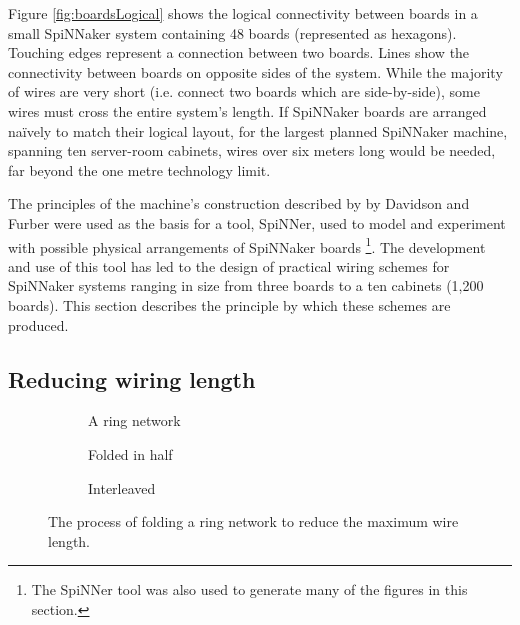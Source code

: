 		Figure \ref{fig:boardsLogical} shows the logical connectivity between boards
		in a small SpiNNaker system containing 48 boards (represented as hexagons).
		Touching edges represent a connection between two boards. Lines show the
		connectivity between boards on opposite sides of the system. While the
		majority of wires are very short (i.e. connect two boards which are
		side-by-side), some wires must cross the entire system's length. If
		SpiNNaker boards are arranged na\"ively to match their logical layout, for
		the largest planned SpiNNaker machine, spanning ten server-room cabinets,
		wires over six meters long would be needed, far beyond the one metre
		technology limit.
		
		The principles of the machine's construction described by by Davidson
		\cite{davidsonWiring} and Furber \cite{furber13email} were used as the basis
		for a tool, SpiNNer, used to model and experiment with possible physical
		arrangements of SpiNNaker boards \footnote{The SpiNNer tool was also used to
		generate many of the figures in this section.}. The development and use of
		this tool has led to the design of practical wiring schemes for SpiNNaker
		systems ranging in size from three boards to a ten cabinets (1,200 boards).
		This section describes the principle by which these schemes are produced.
		
		\subsection{Reducing wiring length}
			
			\begin{figure}
				\begin{subfigure}[b]{\textwidth}
					\center
					
					\caption{A ring network}
					\label{fig:ringLong}
				\end{subfigure}
				
				\vspace{2ex}
				
				\begin{subfigure}[b]{\textwidth}
					\center
					
					\caption{Folded in half}
					\label{fig:ringFolded}
				\end{subfigure}
				
				\vspace{2ex}
				
				\begin{subfigure}[b]{\textwidth}
					\center
					
					\caption{Interleaved}
					\label{fig:ringInterleaved}
				\end{subfigure}
				
				\caption[Folding a ring network.]{The process of folding a ring network
				to reduce the maximum wire length.}
				\label{fig:folding}
			\end{figure}
			
